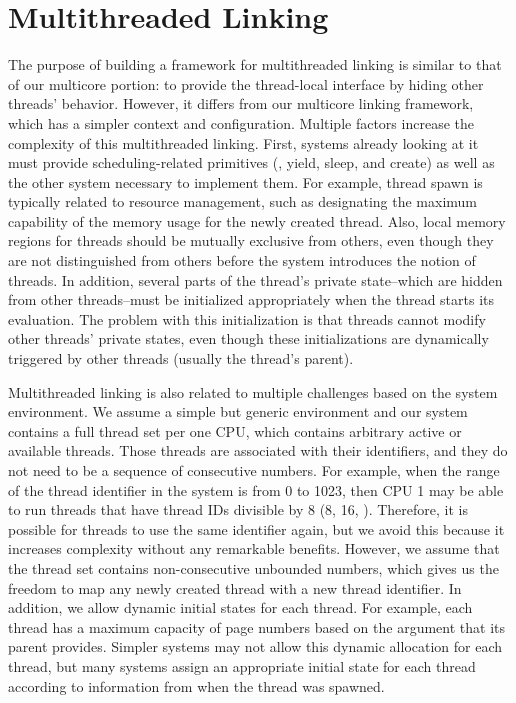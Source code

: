 \section{Multithreaded Linking}
\label{chapter:linking:sec:multithreaded-linking}

The purpose of building a framework for multithreaded linking is similar to that of our multicore portion: 
to provide the thread-local interface by hiding other threads’ behavior. 
However, it differs from our multicore linking framework, which has a simpler context and configuration. 
Multiple factors increase the complexity of this multithreaded linking. 
First, systems already looking at it must provide scheduling-related primitives (\ie, yield, sleep, and create) as well as the other system necessary to implement them. 
For example, thread spawn is typically related to resource management, such as designating the maximum capability of the memory usage for the newly created thread. 
Also, local memory regions for threads should be mutually exclusive from 
others, even though they are not distinguished from others before the system introduces the notion of threads. 
In addition, several parts of the thread’s private state--which are hidden from other threads--must be initialized appropriately when the thread starts its evaluation. 
The problem with this initialization is that threads cannot modify other threads’ private states, even though these initializations are dynamically triggered by other threads (usually the thread’s parent).

Multithreaded linking is also related to multiple challenges based on the system environment. 
We assume a simple but generic environment and our system contains a full thread set per one CPU, 
which contains arbitrary active or available threads. 
Those threads are associated with their identifiers, and they do not need to be a sequence of consecutive numbers. 
For example, when the range of the thread identifier in the system is from 0 to 1023, then CPU 1 may be able to run threads that have thread IDs divisible by 8 (8, 16, \etc). 
Therefore, it is possible for threads to use the same identifier again, but we avoid this because it increases complexity without any remarkable benefits. 
However, we assume that the thread set contains non-consecutive unbounded numbers, which gives us the freedom to map any newly created thread with a new thread identifier. 
In addition, we allow dynamic initial states for each thread. 
For example, each thread has a maximum capacity of page numbers based on the argument that its parent provides. 
Simpler systems may not allow this dynamic allocation for each thread, but many systems assign an appropriate initial state for each thread according to information from when the thread was spawned.


